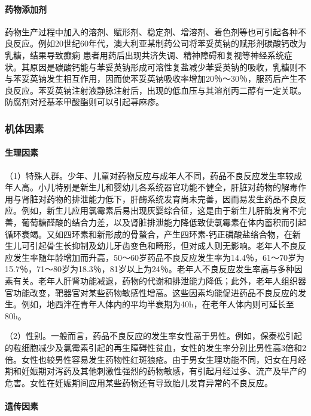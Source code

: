 \paragraph{药物添加剂}

药物生产过程中加入的溶剂、赋形剂、稳定剂、增溶剂、着色剂等也可引起各种不良反应。例如20世纪60年代，澳大利亚某制药公司将苯妥英钠的赋形剂碳酸钙改为乳糖，结果导致癫痫
患者用药后出现共济失调、精神障碍和复视等神经系统症状。其原因是碳酸钙能与苯妥英钠形成可溶性复盐减少苯妥英钠的吸收，乳糖则不与苯妥英钠发生相互作用，因而使苯妥英钠吸收率增加20％～30％，服药后产生不良反应。苯妥英钠注射液静脉注射后，出现的低血压与其溶剂丙二醇有一定关联。防腐剂对羟基苯甲酸酯则可以引起荨麻疹。

\subsubsection{机体因素}
\paragraph{生理因素}

（1）特殊人群。少年、儿童对药物反应与成年人不同，药品不良反应发生率较成年人高。小儿特别是新生儿和婴幼儿各系统器官功能不健全，肝脏对药物的解毒作用与肾脏对药物的排泄能力低下，肝酶系统发育尚未完善，因而易发生药品不良反应。例如，新生儿应用氯霉素后易出现灰婴综合征，这是由于新生儿肝酶发育不完善，葡萄糖醛酸的结合力差，以及肾脏排泄能力降低致使氯霉素在体内蓄积而引起循环衰竭。又如四环素和新形成的骨螯合，产生四环素-钙正磷酸盐络合物，在新生儿可引起骨生长抑制及幼儿牙齿变色和畸形，但对成人则无影响。老年人不良反应发生率随年龄增加而升高，50～60岁药品不良反应发生率为14.4％，61～70岁为15.7％，71～80岁为18.3％，81岁以上为24％。老年人不良反应发生率高与多种因素有关。老年人肝肾功能减退，药物的代谢和排泄能力降低；此外，老年人组织器官功能改变，靶器官对某些药物敏感性增高。这些因素均能促进药品不良反应的发生。例如，地西泮在青年人体内的平均半衰期为40h，在老年人体内则可延长至80h。

（2）性别。一般而言，药品不良反应的发生率女性高于男性。例如，保泰松引起的粒细胞减少及氯霉素引起的再生障碍性贫血，女性的发生率分别比男性高3倍和2倍。女性也较男性容易发生药物性红斑狼疮。由于男女生理功能不同，妇女在月经期和妊娠期对泻药及其他刺激性强烈的药物敏感，有引起月经过多、流产及早产的危害。女性在妊娠期间应用某些药物还有导致胎儿发育异常的不良反应。
\paragraph{遗传因素}

